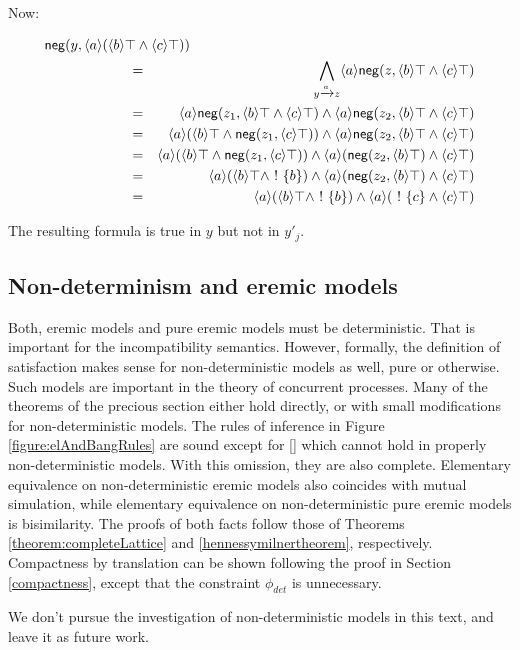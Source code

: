 \NI Now:

\begin{eqnarray*}
\lefteqn{\mathsf{neg}(y, \langle a \rangle (\langle b \rangle \top \AND \langle c \rangle \top))}\qquad \qquad \qquad  \\
& = & \bigwedge\limits_{y \xrightarrow{a} z} \langle a \rangle \mathsf{neg}(z, \langle b \rangle \top \AND \langle c \rangle \top)  \\
& = & \langle a \rangle \mathsf{neg}(z_1, \langle b \rangle \top \AND \langle c \rangle \top) \AND \langle a \rangle\mathsf{neg}(z_2, \langle b \rangle \top \AND \langle c \rangle \top)  \\
& = & \langle a \rangle (\langle b \rangle \top \AND \mathsf{neg}(z_1, \langle c \rangle \top)) \AND \langle a \rangle\mathsf{neg}(z_2, \langle b \rangle \top \AND \langle c \rangle \top)  \\
& = & \langle a \rangle (\langle b \rangle \top \AND \mathsf{neg}(z_1, \langle c \rangle \top)) \AND \langle a \rangle(\mathsf{neg}(z_2, \langle b \rangle \top) \AND \langle c \rangle \top)  \\
& = & \langle a \rangle (\langle b \rangle \top \AND \fBang \{b\}) \AND \langle a \rangle(\mathsf{neg}(z_2, \langle b \rangle \top) \AND \langle c \rangle \top)  \\
& = & \langle a \rangle (\langle b \rangle \top \AND \fBang \{b\}) \AND \langle a \rangle(\fBang \{c\} \AND \langle c \rangle \top) 
\end{eqnarray*}

\NI The resulting formula is true in $y$ but not in $y'_j$.


\subsection{Non-determinism and eremic models}

Both, eremic models and pure eremic models must be deterministic. That
is important for the incompatibility semantics. However, formally, the
definition of satisfaction makes sense for non-deterministic models as
well, pure or otherwise. Such models are important in the theory of
concurrent processes. Many of the theorems of the precious section
either hold directly, or with small modifications for
non-deterministic models. The rules of inference in Figure
\ref{figure:elAndBangRules} are sound except for
    [] which cannot hold in properly
    non-deterministic models. With this omission, they are also
    complete.  Elementary equivalence on non-deterministic eremic
    models also coincides with mutual simulation, while elementary
    equivalence on non-deterministic pure eremic models is
    bisimilarity. The proofs of both facts follow those of Theorems
    \ref{theorem:completeLattice} and \ref{hennessymilnertheorem},
    respectively. Compactness by translation can be shown following
    the proof in Section \ref{compactness}, except that the constraint
    $\phi_{det}$ is unnecessary.

We don't pursue the investigation of non-deterministic models in this
text, and leave it as future work.
